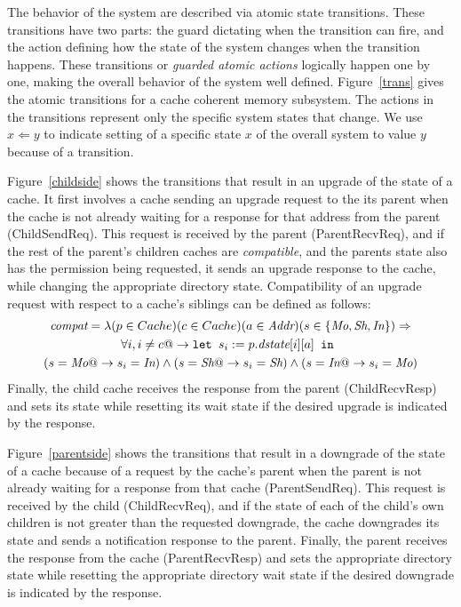 The behavior of the system are described via atomic state transitions.
These transitions have two parts: the guard dictating when the
transition can fire, and the action defining how the state of the
system changes when the transition happens. These transitions or \emph{guarded
atomic actions} logically happen one by one, making the overall behavior of the
system well defined. Figure~\ref{trans} gives the atomic transitions for a
cache coherent memory subsystem. The actions in the transitions represent only
the specific system states that change. We use $x \Leftarrow y$ to indicate
setting of a specific state $x$ of the overall system to value $y$ because of a
transition.

Figure~\ref{childside} shows the transitions that result in an upgrade of the
state of a cache. It first involves a cache sending an upgrade request to the
its parent when the cache is not already waiting for a response for that
address from the parent (ChildSendReq). This request is received by the parent
(ParentRecvReq), and if the rest of the parent's children caches are
\emph{compatible}, and the parents state also has the permission being
requested, it sends an upgrade response to the cache, while changing the
appropriate directory state. Compatibility of an upgrade request with respect
to a cache's siblings can be defined as follows:
\begin{multline*}
\textit{compat} = \lambda (p \in Cache) (c \in Cache) (a \in \textit{Addr}) (s \in
\{\textit{Mo}, \textit{Sh}, \textit{In}\}) \Rightarrow\\ \forall i, i \ne c @->
\texttt{let } s_i := p.\textit{dstate}[i][a] \texttt{ in }\\
 (s = \textit{Mo} @-> s_i = \textit{In}) \wedge (s = \textit{Sh} @-> s_i = \textit{Sh}) \wedge (s = \textit{In} @-> s_i = \textit{Mo})
\end{multline*}
Finally, the child cache receives the response from the parent (ChildRecvResp)
and sets its state while resetting its wait state if the desired upgrade is
indicated by the response.

Figure~\ref{parentside} shows the transitions that result in a downgrade of the
state of a cache because of a request by the cache's parent when the parent is
not already waiting for a response from that cache (ParentSendReq).  This
request is received by the child (ChildRecvReq), and if the state of each of
the child's own children is not greater than the requested downgrade, the cache
downgrades its state and sends a notification response to the parent. Finally,
the parent receives the response from the cache (ParentRecvResp) and sets the
appropriate directory state while resetting the appropriate directory wait state
if the desired downgrade is indicated by the response.

